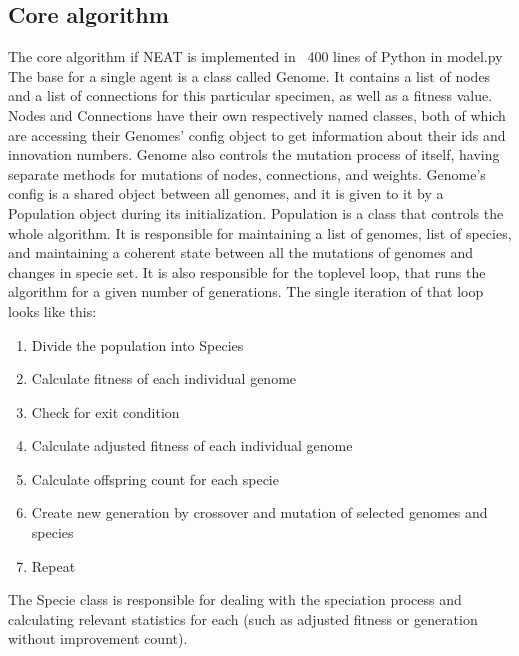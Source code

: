 \documentclass{article}
\begin{document}
        \subsection{Core algorithm}
        The core algorithm if NEAT is implemented in ~400 lines of Python in model.py
        The base for a single agent is a class called Genome. It contains a list of nodes and a list of connections for this particular 
        specimen, as well as a fitness value. Nodes and Connections have their own respectively named classes, both of which are accessing
        their Genomes' config object to get information about their ids and innovation numbers. Genome also controls the mutation process of itself,
        having separate methods for mutations of nodes, connections, and weights. Genome's config is a shared object between all genomes, and it is 
        given to it by a Population object during its initialization. Population is a class that controls the whole algorithm. It is responsible for
        maintaining a list of genomes, list of species, and maintaining a coherent state between all the mutations of genomes and changes in specie set.
        It is also responsible for the toplevel loop, that runs the algorithm for a given number of generations. The single iteration of that loop looks like this:
        \begin{enumerate}
            \item Divide the population into Species
            \item Calculate fitness of each individual genome
            \item Check for exit condition
            \item Calculate adjusted fitness of each individual genome
            \item Calculate offspring count for each specie
            \item Create new generation by crossover and mutation of selected genomes and species
            \item Repeat
        \end{enumerate}
        The Specie class is responsible for dealing with the speciation process and calculating relevant statistics for each (such as adjusted fitness or 
        generation without improvement count). 
\end{document}
